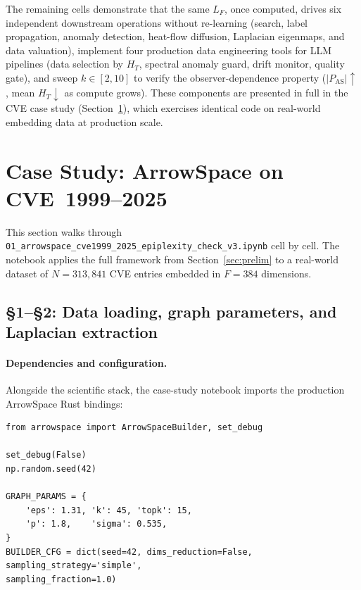 \documentclass[12pt,a4paper]{article}
\theoremstyle{plain}
\theoremstyle{definition}
\theoremstyle{remark}
\newcommand{\1}{\mathbf{1}}
\begin{document}
	The remaining cells demonstrate that the same $L_F$, once computed,
	drives six independent downstream operations without re-learning
	(search, label propagation, anomaly detection, heat-flow diffusion,
	Laplacian eigenmaps, and data valuation), implement four production data
	engineering tools for LLM pipelines (data selection by $H_T$, spectral
	anomaly guard, drift monitor, quality gate), and sweep $k\in[2,10]$ to
	verify the observer-dependence property ($|P_\mathrm{AS}|\uparrow$,
	mean $H_T\downarrow$ as compute grows).
	These components are presented in full in the CVE case study
	(Section~\ref{sec:notebook}), which exercises identical code on
	real-world embedding data at production scale.
	
	\section{Case Study: ArrowSpace on CVE~1999--2025}
	\label{sec:notebook}
	
	This section walks through
	\texttt{01\_arrowspace\_cve1999\_2025\_epiplexity\_check\_v3.ipynb}
	cell by cell.
	The notebook applies the full framework from Section~\ref{sec:prelim}
	to a real-world dataset of $N=313{,}841$ CVE entries embedded in
	$F=384$ dimensions.
	
	\subsection{§1--§2: Data loading, graph parameters, and Laplacian extraction}
	
	\paragraph{Dependencies and configuration.}
	Alongside the scientific stack, the case-study notebook imports the
	production ArrowSpace Rust bindings:
	
	\begin{lstlisting}[caption={Imports and ArrowSpace bindings},
		label={lst:imports01}]
from arrowspace import ArrowSpaceBuilder, set_debug

set_debug(False)
np.random.seed(42)

GRAPH_PARAMS = {
	'eps': 1.31, 'k': 45, 'topk': 15,
	'p': 1.8,    'sigma': 0.535,
}
BUILDER_CFG = dict(seed=42, dims_reduction=False,
sampling_strategy='simple',
sampling_fraction=1.0)
	\end{lstlisting}
	
\end{document}
